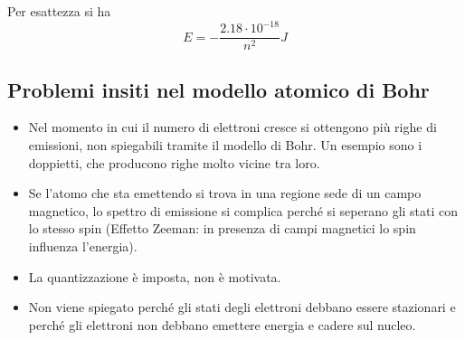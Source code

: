 Per esattezza si ha
$$E=-\frac{2.18\cdot10^{-18}}{n^2}J$$
\subsection{Problemi insiti nel modello atomico di Bohr}
\begin{itemize}
  \item Nel momento in cui il numero di elettroni cresce si ottengono più righe di emissioni, non spiegabili tramite il modello di Bohr. Un esempio sono i doppietti, che producono righe molto vicine tra loro.
  \item Se l'atomo che sta emettendo si trova in una regione sede di un campo magnetico, lo spettro di emissione si complica perché si seperano gli stati con lo stesso spin
  (Effetto Zeeman: in presenza di campi magnetici lo spin influenza l'energia).
  \item La quantizzazione è imposta, non è motivata.
  \item Non viene spiegato perché gli stati degli elettroni debbano essere stazionari e perché gli elettroni non debbano emettere energia e cadere sul nucleo.
\end{itemize}
\newpage